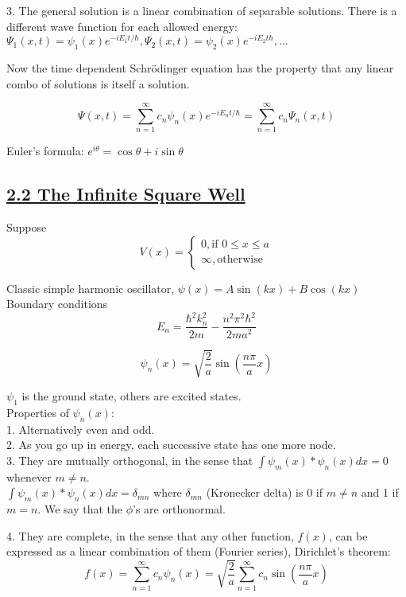\smallskip

3. The general solution is a linear combination of separable solutions. There is a different wave function for each allowed energy: $\Psi_1(x,t) = \psi_1(x) e^{-iE_1 t / \hbar}, \Psi_2(x,t) = \psi_2 (x) e^{-iE_2 t \hbar}, ...$

Now the time dependent Schr\"{o}dinger equation has the property that any linear combo of solutions is itself a solution.

$$\Psi(x, t) = \sum_{n=1}^{\infty} c_n \psi_n(x) e^{-iE_n t / \hbar} = \sum_{n=1}^{\infty} c_n \Psi_n(x, t)$$

\smallskip

Euler's formula: $e^{i \theta} = \cos \theta + i \sin \theta$

\subsection{\underline{2.2 The Infinite Square Well}}

Suppose
    $$V(x) = \begin{cases} 0, \textrm{if } 0 \leq x \leq a \\ \infty, \textrm{otherwise} \end{cases}$$

Classic simple harmonic oscillator, $\psi(x) = A \sin(kx) + B \cos(kx)$ \\

Boundary conditions \\

$$E_n = \frac{\hbar^2 k_n^2}{2m} - \frac{n^2 \pi^2 \hbar^2}{2ma^2}$$

$$\psi_n(x) = \sqrt{\frac{2}{a}} \sin(\frac{n \pi}{a} x)$$

$\psi_1$ is the ground state, others are excited states. \\

Properties of $\psi_n(x)$: \\
1. Alternatively even and odd. \\
2. As you go up in energy, each successive state has one more node. \\
3. They are mutually orthogonal, in the sense that $\int \psi_m(x)* \psi_n(x) dx = 0$ whenever $m \neq n$. \\

$\int \psi_m (x)* \psi_n(x) dx = \delta_{mn}$
where $\delta_{mn}$ (Kronecker delta) is 0 if $m \neq n$ and 1 if $m=n$. We say that the $\phi$'s are orthonormal.

4. They are complete, in the sense that any other function, $f(x)$, can be expressed as a linear combination of them (Fourier series), Dirichlet's theorem:
    $$f(x) = \sum_{n=1}^{\infty} c_n \psi_n(x) = \sqrt{\frac{2}{a}} \sum_{n=1}^{\infty} c_n \sin(\frac{n \pi}{a} x)$$

